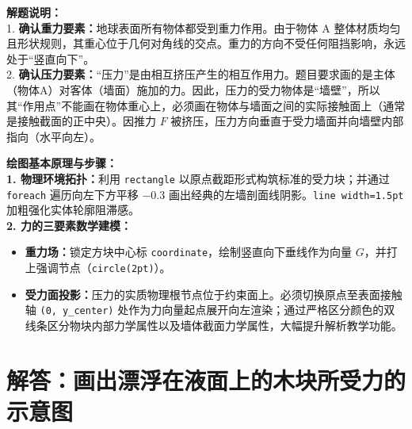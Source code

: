 \documentclass[12pt, a4paper]{ctexrep}
\begin{document}
\vspace{0.6cm}

{\small\color{gray}
\textbf{解题说明：}\\
1. \textbf{确认重力要素：}地球表面所有物体都受到重力作用。由于物体 A 整体材质均匀且形状规则，其重心位于几何对角线的交点。重力的方向不受任何阻挡影响，永远处于“竖直向下”。\\
2. \textbf{确认压力要素：}“压力”是由相互挤压产生的相互作用力。题目要求画的是主体（物体A）对客体（墙面）施加的力。因此，压力的受力物体是“墙壁”，所以其“作用点”不能画在物体重心上，必须画在物体与墙面之间的实际接触面上（通常是接触截面的正中央）。因推力 $F$ 被挤压，压力方向垂直于受力墙面并向墙壁内部指向（水平向左）。
}

\vspace{0.6cm}

{\small\color{blue!70!black}
\textbf{绘图基本原理与步骤：}\\
\textbf{1. 物理环境拓扑：}利用 \texttt{rectangle} 以原点截距形式构筑标准的受力块；并通过 \texttt{foreach} 遍历向左下方平移 $-0.3$ 画出经典的左墙剖面线阴影。\texttt{line width=1.5pt} 加粗强化实体轮廓阻滞感。\\
\textbf{2. 力的三要素数学建模：}
\begin{itemize}
    \item \textbf{重力场：}锁定方块中心标 \texttt{coordinate}，绘制竖直向下垂线作为向量 $G$，并打上强调节点（\texttt{circle(2pt)}）。
    \item \textbf{受力面投影：}压力的实质物理根节点位于约束面上。必须切换原点至表面接触轴 \texttt{(0, y\_center)} 处作为力向量起点展开向左渲染；通过严格区分颜色的双线条区分物块内部力学属性以及墙体截面力学属性，大幅提升解析教学功能。
\end{itemize}
}



\section{解答：画出漂浮在液面上的木块所受力的示意图}

\vspace{0.6cm}
\end{document}

